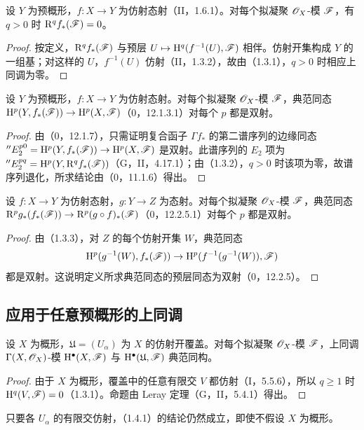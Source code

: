 设 $Y$ 为预概形，$f:X\to Y$ 为仿射态射（II，1.6.1）。对每个拟凝聚 $\mathscr O_X$-模 $\mathscr F$，有 $q>0$ 时 $\mathrm R^qf_*(\mathscr F)=0$。
\begin{proof}
按定义，$\mathrm R^qf_*(\mathscr F)$ 与预层 $U\mapsto\mathrm H^q(f^{-1}(U),\mathscr F)$ 相伴。仿射开集构成 $Y$ 的一组基；对这样的 $U$，$f^{-1}(U)$ 仿射（II，1.3.2），故由（1.3.1），$q>0$ 时相应上同调为零。
\end{proof}

设 $Y$ 为预概形，$f:X\to Y$ 为仿射态射。对每个拟凝聚 $\mathscr O_X$-模 $\mathscr F$，典范同态 $\mathrm H^p(Y,f_*(\mathscr F))\to\mathrm H^p(X,\mathscr F)$（0，12.1.3.1）对每个 $p$ 都是双射。
\begin{proof}
由（0，12.1.7），只需证明复合函子 $\Gamma f_*$ 的第二谱序列的边缘同态 ${}''E_2^{p0}=\mathrm H^p(Y,f_*(\mathscr F))\to\mathrm H^p(X,\mathscr F)$ 是双射。此谱序列的 $E_2$ 项为 ${}''E_2^{pq}=\mathrm H^p(Y,\mathrm R^qf_*(\mathscr F))$（G，II，4.17.1）；由（1.3.2），$q>0$ 时该项为零，故谱序列退化，所求结论由（0，11.1.6）得出。
\end{proof}

设 $f:X\to Y$ 为仿射态射，$g:Y\to Z$ 为态射。对每个拟凝聚 $\mathscr O_X$-模 $\mathscr F$，典范同态 $\mathrm R^pg_*(f_*(\mathscr F))\to\mathrm R^p(g\circ f)_*(\mathscr F)$（0，12.2.5.1）对每个 $p$ 都是双射。
\begin{proof}
由（1.3.3），对 $Z$ 的每个仿射开集 $W$，典范同态
\[
\mathrm H^p(g^{-1}(W),f_*(\mathscr F))\to\mathrm H^p(f^{-1}(g^{-1}(W)),\mathscr F)
\]
都是双射。这说明定义所求典范同态的预层同态为双射（0，12.2.5）。
\end{proof}\par

\subsection{应用于任意预概形的上同调}
设 $X$ 为概形，$\mathfrak U=(U_\alpha)$ 为 $X$ 的仿射开覆盖。对每个拟凝聚 $\mathscr O_X$-模 $\mathscr F$，上同调 $\Gamma(X,\mathscr O_X)$-模 $\mathrm H^\bullet(X,\mathscr F)$ 与 $\mathrm H^\bullet(\mathfrak U,\mathscr F)$ 典范同构。
\begin{proof}
由于 $X$ 为概形，覆盖中的任意有限交 $V$ 都仿射（I，5.5.6），所以 $q\geq1$ 时 $\mathrm H^q(V,\mathscr F)=0$（1.3.1）。命题由 Leray 定理（G，II，5.4.1）得出。
\end{proof}

只要各 $U_\alpha$ 的有限交仿射，（1.4.1）的结论仍然成立，即使不假设 $X$ 为概形。

